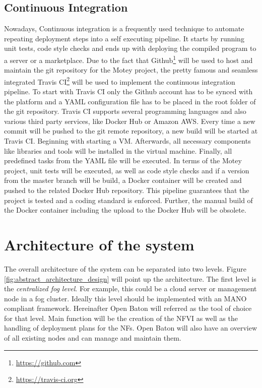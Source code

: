 \subsection{Continuous Integration}
Nowadays, Continuous integration is a frequently used technique to automate repeating deployment steps into a self executing pipeline.
It starts by running unit tests, code style checks and ends up with deploying the compiled program to a server or a marketplace.
Due to the fact that Github\footnote{\url{https://github.com}} will be used to host and maintain the git repository for the Motey project, the pretty famous and seamless integrated Travis CI\footnote{\url{https://travis-ci.org}} will be used to implement the continuous integration pipeline.
To start with Travis CI only the Github account has to be synced with the platform and a \ac{YAML} configuration file has to be placed in the root folder of the git repository.
Travis CI supports several programming languages and also various third party services, like Docker Hub or Amazon AWS.
Every time a new commit will be pushed to the git remote repository, a new build will be started at Travis CI.
Beginning with starting a \ac{VM}.
Afterwards, all necessary components like libraries and tools will be installed in the virtual machine.
Finally, all predefined tasks from the \ac{YAML} file will be executed.
In terms of the Motey project, unit tests will be executed, as well as code style checks and if a version from the master branch will be build, a Docker container will be created and pushed to the related Docker Hub repository.
This pipeline guarantees that the project is tested and a coding standard is enforced.
Further, the manual build of the Docker container including the upload to the Docker Hub will be obsolete.


\section{Architecture of the system}
The overall architecture of the system can be separated into two levels.
Figure \ref{fig:abstract_architecture_design} will point up the architecture.
The first level is the \textit{centralized fog level}.
For example, this could be a cloud server or management node in a fog cluster.
Ideally this level should be implemented with an \ac{MANO} compliant framework.
Hereinafter Open Baton will referred as the tool of choice for that level.
Main function will be the creation of the \ac{NFVI} as well as the handling of deployment plans for the \acp{NF}.
Open Baton will also have an overview of all existing nodes and can manage and maintain them.

